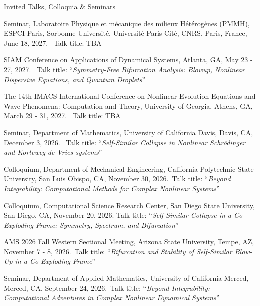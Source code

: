 \documentclass[10pt]{article} %
\begin{document}
\begin{section}{Invited Talks, Colloquia \& Seminars}
\begin{etaremune}
\setlength\itemsep{1em}

\item
\vskip  -6.5mm

Seminar, Laboratoire Physique et mécanique des milieux Hétérogènes (PMMH), ESPCI Paris, Sorbonne Université, Université Paris Cité, CNRS, Paris, France, June 18, 2027.%
~Talk title: TBA

\item SIAM Conference on Applications of Dynamical Systems, Atlanta, GA, May 23 - 27, 2027.%
~Talk title: ``\textit{Symmetry-Free Bifurcation Analysis: Blowup, Nonlinear Dispersive Equations, and Quantum Droplets}''

\item The 14th IMACS International Conference on Nonlinear Evolution Equations and Wave Phenomena: Computation and Theory, University of Georgia, Athens, GA, March 29 - 31, 2027.%
~Talk title: TBA

\item Seminar, Department of Mathematics, University of California Davis, Davis, CA, December 3, 2026.%
~Talk title: ``\textit{Self-Similar Collapse in Nonlinear Schr\"odinger and Korteweg-de Vries systems}''

\item Colloquium, Department of Mechanical Engineering, California Polytechnic State University, San Luis Obispo, CA, November 30, 2026.~Talk title: ``\textit{Beyond Integrability: Computational Methods for Complex Nonlinear Systems}''

\item Colloquium, Computational Science Research Center, San Diego State University, San Diego, CA, November 20, 2026.
Talk title: ``\textit{Self-Similar Collapse in a Co-Exploding Frame: Symmetry, Spectrum, and Bifurcation}''

\item AMS 2026 Fall Western Sectional Meeting, Arizona State University, Tempe, AZ, November 7 - 8, 2026.~Talk title: ``\textit{Bifurcation and Stability of Self-Similar Blow-Up in a Co-Exploding Frame}''

\item Seminar, Department of Applied Mathematics, University of California Merced, Merced, CA, September 24, 2026.~Talk title: ``\textit{Beyond Integrability: Computational Adventures in Complex Nonlinear Dynamical Systems}''


\end{etaremune}
\end{section}
\end{document}

